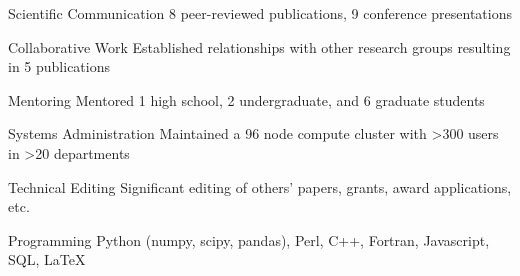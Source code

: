 


\begin{cvskills}


\cvskill
{Scientific Communication} %
{8 peer-reviewed publications, 9 conference presentations} %


\cvskill
{Collaborative Work} %
{Established relationships with other research groups resulting in 5 publications} %


\cvskill
{Mentoring} %
{Mentored 1 high school, 2 undergraduate, and 6 graduate students} %


\cvskill
{Systems Administration} %
{Maintained a 96 node compute cluster with >300 users in >20 departments} %


\cvskill
{Technical Editing} %
{Significant editing of others' papers, grants, award applications, etc.} %


\cvskill
{Programming} %
{Python (numpy, scipy, pandas), Perl, C++, Fortran, Javascript, SQL, LaTeX} %


\end{cvskills}
